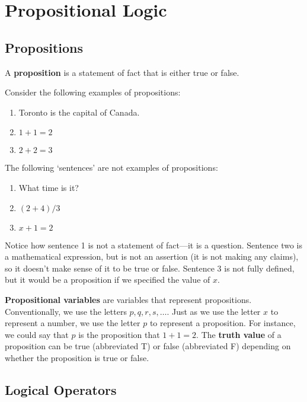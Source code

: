 \section{Propositional Logic}
\subsection{Propositions}
\begin{defn}
  A \textbf{proposition} is a statement of fact that is either true or
  false.
\end{defn}

\begin{example}
  Consider the following examples of propositions:
  \begin{enumerate}
  \item Toronto is the capital of Canada.
  \item $1+1=2$
  \item $2+2=3$
  \end{enumerate}
\end{example}

\begin{example}
  The following `sentences' are not examples of propositions:
  \begin{enumerate}
  \item What time is it?
  \item $(2+4)/3$
  \item $x+1=2$
  \end{enumerate}
\end{example}

Notice how sentence 1 is not a statement of fact---it is a
question. Sentence two is a mathematical expression, but is not an
assertion (it is not making any claims), so it doesn't make sense of it to
be true or false. Sentence $3$ is not fully defined, but it would be a
proposition if we specified the value of $x$.

\textbf{Propositional variables} are variables that represent
propositions. Conventionally, we use the letters $p,q,r,s,\dots$. Just as
we use the letter $x$ to represent a number, we use the letter $p$ to
represent a proposition. For instance, we could say that $p$ is the
proposition that $1+1=2$. The \textbf{truth value} of a proposition can be
true (abbreviated T) or false (abbreviated F) depending on whether the
proposition is true or false.

\subsection{Logical Operators}

